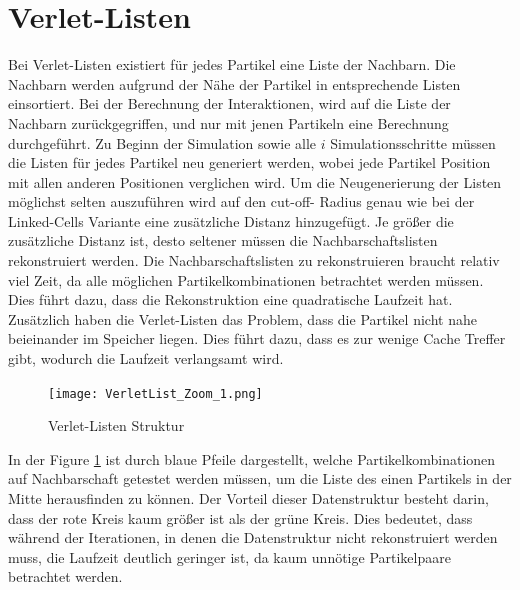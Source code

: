\documentclass[
12pt,
a4paper,
BCOR10mm,
DIV14,
headsepline,
]{scrreprt}
\begin{document}
	\section{Verlet-Listen}%
	Bei Verlet-Listen existiert für jedes Partikel eine Liste der Nachbarn. Die Nachbarn werden aufgrund der Nähe der Partikel in entsprechende Listen einsortiert. Bei der Berechnung der Interaktionen, wird auf die Liste der Nachbarn zurückgegriffen, und nur mit jenen Partikeln eine Berechnung durchgeführt. Zu Beginn der Simulation sowie alle $i$ Simulationsschritte müssen die Listen für jedes Partikel neu generiert werden, wobei jede Partikel Position mit allen anderen Positionen verglichen wird. Um die Neugenerierung der Listen möglichst selten auszuführen wird auf den cut-off- Radius genau wie bei der Linked-Cells Variante eine zusätzliche Distanz hinzugefügt. Je größer die zusätzliche Distanz ist, desto seltener müssen die Nachbarschaftslisten rekonstruiert werden. 
	Die Nachbarschaftslisten zu rekonstruieren braucht relativ viel Zeit, da alle möglichen Partikelkombinationen betrachtet werden müssen. Dies führt dazu, dass die Rekonstruktion eine quadratische Laufzeit hat. Zusätzlich haben die Verlet-Listen das Problem, dass die Partikel nicht nahe beieinander im Speicher liegen. Dies führt dazu, dass es zur wenige Cache Treffer gibt, wodurch die Laufzeit verlangsamt wird.
	\begin{figure}[h]
		\centering
		\texttt{[image: VerletList\_Zoom\_1.png]}
		\caption{Verlet-Listen Struktur}
		\label{figure:VerletListsStructure}
	\end{figure}
	In der Figure \ref{figure:VerletListsStructure} ist durch blaue Pfeile dargestellt, welche Partikelkombinationen auf Nachbarschaft getestet werden müssen, um die Liste des einen Partikels in der Mitte herausfinden zu können. Der Vorteil dieser Datenstruktur besteht darin, dass der rote Kreis kaum größer ist als der grüne Kreis. Dies bedeutet, dass während der Iterationen, in denen die Datenstruktur nicht rekonstruiert werden muss, die Laufzeit deutlich geringer ist, da kaum unnötige Partikelpaare betrachtet werden.
\end{document}
